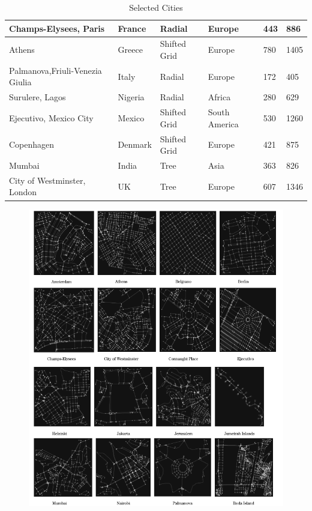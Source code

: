 \begin{landscape}
\begin{table}[]
{\begin{tabular}{|l|l|l|l|l|l|}
Champs-Elysees, Paris           & France      & Radial       & Europe        & 443  & 886  \\ \hline
Athens                          & Greece      & Shifted Grid & Europe        & 780  & 1405 \\ \hline
Palmanova,Friuli-Venezia Giulia & Italy       & Radial       & Europe        & 172  & 405  \\ \hline
Surulere, Lagos                 & Nigeria     & Radial       & Africa        & 280  & 629  \\ \hline
Ejecutivo, Mexico City          & Mexico      & Shifted Grid & South America & 530  & 1260 \\ \hline
Copenhagen                      & Denmark     & Shifted Grid & Europe        & 421  & 875  \\ \hline
Mumbai                          & India       & Tree         & Asia          & 363  & 826  \\ \hline
City of Westminster, London     & UK          & Tree         & Europe        & 607  & 1346 \\ \hline
\end{tabular}%
}
\caption{Selected Cities}
\label{tab:Selcted Cities}
\end{table}
\end{landscape}

\begin{figure}[h!]
\centering
\includegraphics[width=1.0\textwidth,center]{picture/Graphs1.png}
\end{figure}


